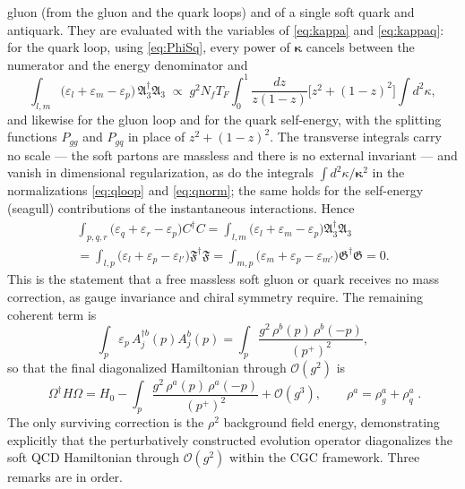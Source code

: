 \documentclass[11pt,a4paper]{article}
\numberwithin{equation}{section}
\newcommand{\mf}[1]{\mathfrak{#1}}
\newcommand{\eps}{\varepsilon}
\newcommand{\dg}{\dagger}
\newcommand{\OM}{\Omega}
\newcommand{\order}[1]{\mathcal{O}(#1)}
\newcommand{\Nf}{N_{f}}
\begin{document}
gluon (from the gluon and the quark loops) and of a single soft quark and antiquark. They are
evaluated with the variables of \eqref{eq:kappa} and \eqref{eq:kappaq}: for the quark loop, using
\eqref{eq:PhiSq}, every power of $\bm\kappa$ cancels between the numerator and the energy
denominator and
\begin{equation}
\int_{l,m}\big(\eps_{l}+\eps_{m}-\eps_{p}\big)\,\mf A_{3}^{\dg}\mf A_{3}
\;\propto\;g^{2}\Nf T_{F}\int_{0}^{1}\!\frac{dz}{z(1-z)}\big[z^{2}+(1-z)^{2}\big]\int\!d^{2}\kappa ,
\end{equation}
and likewise for the gluon loop and for the quark self-energy, with the splitting functions
$P_{gg}$ and $P_{gq}$ in place of $z^{2}+(1-z)^{2}$. The transverse integrals carry no scale --- the
soft partons are massless and there is no external invariant --- and vanish in dimensional
regularization, as do the integrals $\int d^{2}\kappa/\bm\kappa^{2}$ in the normalizations
\eqref{eq:qloop} and \eqref{eq:qnorm}; the same holds for the self-energy (seagull) contributions of the
instantaneous interactions. Hence
\begin{multline}
\int_{p,q,r}\big(\eps_{q}+\eps_{r}-\eps_{p}\big)C^{\dg}C
=\int_{l,m}\big(\eps_{l}+\eps_{m}-\eps_{p}\big)\mf A_{3}^{\dg}\mf A_{3}
\\=\int_{l,p}\big(\eps_{l}+\eps_{p}-\eps_{l'}\big)\mf F^{\dg}\mf F
=\int_{m,p}\big(\eps_{m}+\eps_{p}-\eps_{m'}\big)\mf G^{\dg}\mf G=0 .
\label{eq:loops0}
\end{multline}
This is the statement that a free massless soft gluon or quark receives no mass correction, as
gauge invariance and chiral symmetry require. The remaining coherent term is
\begin{equation}
\int_{p}\eps_{p}\,A^{\dg b}_{j}(p)A^{b}_{j}(p)=\int_{p}\frac{g^{2}\,\rho^{b}(p)\,\rho^{b}(-p)}{(p^{+})^{2}},
\label{eq:WW}
\end{equation}
so that the final diagonalized Hamiltonian through $\order{g^{2}}$ is
\begin{equation}
\boxed{\;
\OM^{\dg}H\OM=H_{0}-\int_{p}\frac{g^{2}\,\rho^{a}(p)\,\rho^{a}(-p)}{(p^{+})^{2}}+\order{g^{3}},
\qquad \rho^{a}=\rho^{a}_{g}+\rho^{a}_{q}\; .}
\label{eq:diagfinal}
\end{equation}
The only surviving correction is the $\rho^{2}$ background field energy, demonstrating explicitly
that the perturbatively constructed evolution operator diagonalizes the soft QCD Hamiltonian through
$\order{g^{2}}$ within the CGC framework. Three remarks are in order.
\end{document}
